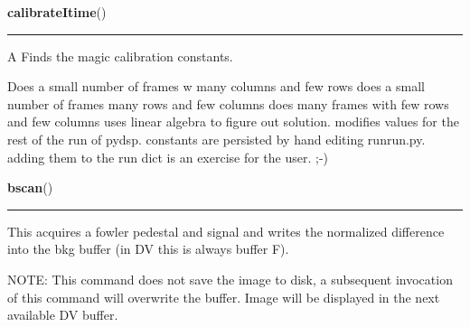     \label{runrun:calibrateItime}

    \vspace{0.5ex}

    \begin{boxedminipage}{\textwidth}

    \raggedright \textbf{calibrateItime}()

    \vspace{-1.5ex}

    \rule{\textwidth}{0.5\fboxrule}
    A Finds the magic calibration constants.

    Does a small number of frames w many columns and few rows does a small 
    number of frames many rows and few columns does many frames with few 
    rows and few columns uses linear algebra to figure out solution. 
    modifies values for the rest of the run of pydsp. constants are 
    persisted by hand editing runrun.py. adding them to the run dict is an 
    exercise for the user. ;-)

    \vspace{1ex}

    \end{boxedminipage}

    \label{runrun:bscan}

    \vspace{0.5ex}

    \begin{boxedminipage}{\textwidth}

    \raggedright \textbf{bscan}()

    \vspace{-1.5ex}

    \rule{\textwidth}{0.5\fboxrule}
    This acquires a fowler pedestal and signal and writes the normalized 
    difference into the bkg buffer (in DV this is always buffer F).

    NOTE: This command does not save the image to disk, a subsequent 
    invocation of this command will overwrite the buffer. Image will be 
    displayed in the next available DV buffer.

    \vspace{1ex}

    \end{boxedminipage}

    \label{runrun:pedscan}

